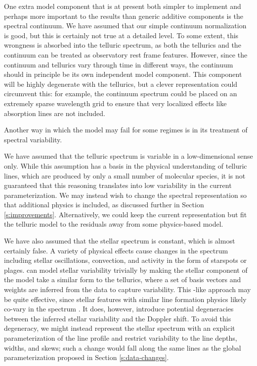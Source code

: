 \documentclass[twocolumn]{aastex62}
\begin{document}
One extra model component that is at present both simpler to implement and perhaps more important to the results than generic additive components is the spectral continuum. 
We have assumed that our simple continuum normalization is good, but this is certainly not true at a detailed level. 
To some extent, this wrongness is absorbed into the telluric spectrum, as both the tellurics and the continuum can be treated as observatory rest frame features. 
However, since the continuum and tellurics vary through time in different ways, the continuum should in principle be its own independent model component. 
This component will be highly degenerate with the tellurics, but a clever representation could circumvent this: for example, the continuum spectrum could be placed on an extremely sparse wavelength grid to ensure that very localized effects like absorption lines are not included.

Another way in which the \wobble model may fail for some regimes is in its treatment of spectral variability.

We have assumed that the telluric spectrum is variable in a low-dimensional sense only. 
While this assumption has a basis in the physical understanding of telluric lines, which are produced by only a small number of molecular species, it is not guaranteed that this reasoning translates into low variability in the current parameterization. 
We may instead wish to change the spectral representation so that additional physics is included, as discussed further in Section \ref{s:improvements}. 
Alternatively, we could keep the current representation but fit the telluric model to the residuals away from some physics-based model. 

We have also assumed that the stellar spectrum is constant, which is almost certainly false. 
A variety of physical effects cause changes in the spectrum including stellar oscillations, convection, and activity in the form of starspots or plages. 
\wobble can model stellar variability trivially by making the stellar component of the model take a similar form to the tellurics, where a set of basis vectors and weights are inferred from the data to capture variability. 
This \PCA-like approach may be quite effective, since stellar features with similar line formation physics likely co-vary in the spectrum \citep{Davis2017, Dumusque2018}. 
It does, however, introduce potential degeneracies between the inferred stellar variability and the Doppler shift. 
To avoid this degeneracy, we might instead represent the stellar spectrum with an explicit parameterization of the line profile and restrict variability to the line depths, widths, and skews; such a change would fall along the same lines as the global \LSF parameterization proposed in Section \ref{s:data-changes}.
\end{document}
